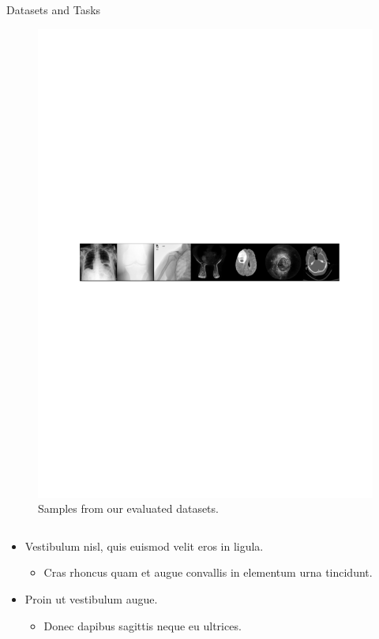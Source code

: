 \documentclass[final,hyperref={pdfpagelabels=false}]{beamer}
\begin{document}
\begin{frame}[t]
\begin{columns}[t]
\begin{column}{.3\textwidth}
\begin{block}{Datasets and Tasks}
\begin{figure}
    \includegraphics[width=0.95\linewidth]{frompaper/data_eg_1row.pdf}
     \caption{Samples from our evaluated datasets.}
\end{figure}

\begin{columns} %
\begin{column}{.54\textwidth} %
\begin{itemize}
\item Vestibulum nisl, quis euismod velit eros in ligula.
\begin{itemize}
\item Cras rhoncus quam et augue convallis in elementum urna tincidunt.
\end{itemize}
\item Proin ut vestibulum augue.
\begin{itemize}
\item Donec dapibus sagittis neque eu ultrices.
\end{itemize}
\end{itemize}
\end{column}


\end{columns}
\end{block}
\end{column}
\end{columns}
\end{frame}
\end{document}
